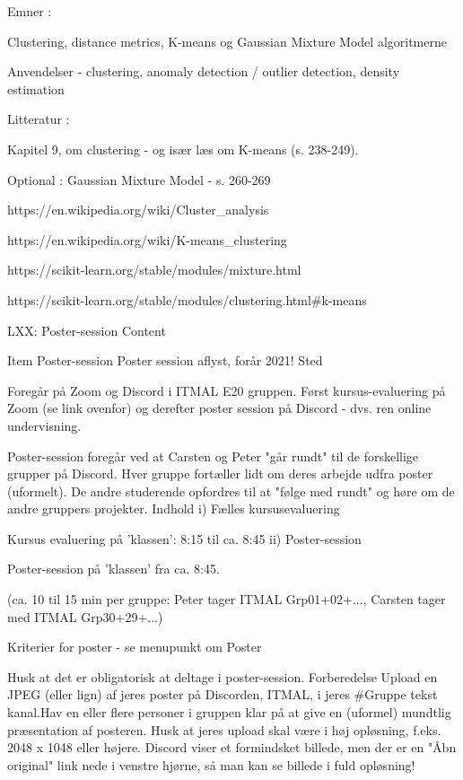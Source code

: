 {    Emner :

    Clustering, distance metrics, K-means og Gaussian Mixture Model algoritmerne

    Anvendelser - clustering, anomaly detection / outlier detection, density estimation


    Litteratur :

    Kapitel 9, om clustering - og især læs om K-means (s. 238-249).

    Optional : Gaussian Mixture Model - s. 260-269

    https://en.wikipedia.org/wiki/Cluster_analysis 

    https://en.wikipedia.org/wiki/K-means_clustering

    https://scikit-learn.org/stable/modules/mixture.html

    https://scikit-learn.org/stable/modules/clustering.html#k-means 
    
    
LXX: Poster-session
Content

    Item
    Poster-session
    Poster session aflyst, forår 2021!
    Sted

    Foregår på Zoom og Discord i ITMAL E20 gruppen. Først kursus-evaluering på Zoom (se link ovenfor) og derefter poster session på Discord - dvs. ren online undervisning.

    Poster-session foregår ved at Carsten og Peter "går rundt" til de forskellige grupper på Discord. Hver gruppe fortæller lidt om deres arbejde udfra poster (uformelt). De andre studerende opfordres til at "følge med rundt" og høre om de andre gruppers projekter.
    Indhold
    i) Fælles kursusevaluering

    Kursus evaluering på 'klassen': 8:15 til ca. 8:45
    ii) Poster-session

    Poster-session på 'klassen'  fra ca. 8:45.

    (ca. 10 til 15 min per gruppe: Peter tager ITMAL Grp01+02+..., Carsten tager med ITMAL Grp30+29+...)

    Kriterier for poster - se menupunkt om Poster 

    Husk at det er obligatorisk at deltage i poster-session.
    Forberedelse
        Upload en JPEG (eller lign) af jeres poster på Discorden, ITMAL, i jeres #Gruppe tekst kanal.Hav en eller flere personer i gruppen klar på at give en (uformel) mundtlig præsentation af posteren.
            Husk at jeres upload skal være i høj opløsning, f.eks. 2048 x 1048 eller højere.
            Discord viser et formindsket billede, men der er en "Åbn original" link nede i venstre hjørne, så man kan se billede i fuld opløsning!

























}
